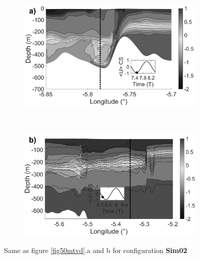 \begin{figure}[!t]
  
  \begin{subfigure}{0.5\linewidth}
  \includegraphics[width=\textwidth]{./papier2D/RW_J3_21_hydro.png}
  \end{subfigure}
  ~
  \begin{subfigure}{0.5\linewidth}
  \includegraphics[width=\textwidth]{./papier2D/RW_83T_hydro.png}
  \end{subfigure}
 
  \caption{Same as figure \ref{fig50mtvd}.a %
  and b for configuration \textbf{Sim02}}
  \label{fig220HNH}
\end{figure}

